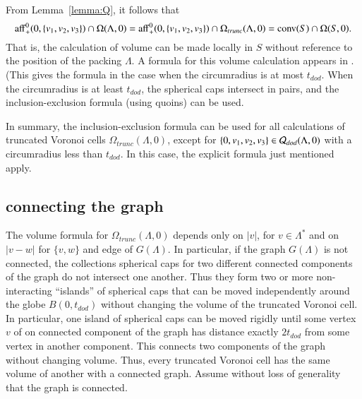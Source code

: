 From Lemma~\ref{lemma:Q}, it follows that
\begin{equation}\label{eqn:omega-3}
{\operatorname{aff}}^0_+(0,\{v_1,v_2,v_3\}) \cap \Omega(\Lambda,0) = 
{\operatorname{aff}}^0_+(0,\{v_1,v_2,v_3\}) \cap \Omega_{trunc}(\Lambda,0) = 
{\operatorname{conv}}(S)\cap\Omega(S,0).
\end{equation}
That is, the calculation of volume can be made locally in $S$ without
reference to the position of the packing $\Lambda$.
A formula for this volume calculation appears in 
\cite[\S8.6.3]{Part1}.  (This gives the formula in the case
when the circumradius is at most $t_{dod}$.  When the circumradius
is at least $t_{dod}$, the spherical caps intersect in pairs,
and the inclusion-exclusion formula (using quoins)
can be used.

In summary, the inclusion-exclusion formula can be used for all
calculations of truncated Voronoi cells $\Omega_{trunc}(\Lambda,0)$,
except for $\{0,v_1,v_2,v_3\}\in {\mathcal Q}_{dod}(\Lambda,0)$ with
a circumradius less than $t_{dod}$.  In this case, 
the explicit formula just mentioned apply.

\subsection{connecting the graph}

The volume formula for $\Omega_{trunc}(\Lambda,0)$
depends only on $|v|$, for $v\in\Lambda^*$ and on
$|v-w|$ for $\{v,w\}$ and edge of $G(\Lambda)$.
In particular, if the graph $G(\Lambda)$ is not connected, the
collections spherical caps for two different connected components
of the graph do not intersect one another.  Thus they form
two or more non-interacting ``islands'' of spherical caps that
can be moved independently around the globe $B(0,t_{dod})$
without changing the volume of
the truncated Voronoi cell.  In particular, one island of spherical
caps can be moved rigidly until some vertex $v$ of on connected
component of the graph has distance exactly $2t_{dod}$ from some
vertex in another component.  This connects two components of the
graph without changing volume.  Thus, every truncated Voronoi cell
has the same volume of another with a connected graph.  
Assume without loss of generality that the graph is connected.

